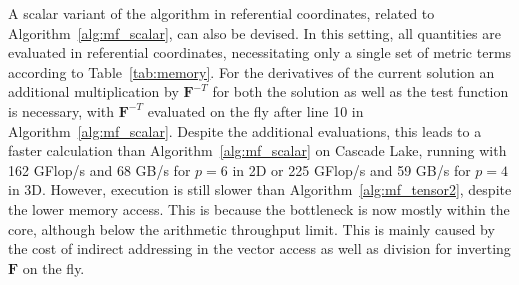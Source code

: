 \documentclass[AMA,STIX1COL]{WileyNJD-v2}
\newcommand*{\gz}[1]{\boldsymbol{#1}}
\begin{document}
A scalar variant of the algorithm in referential coordinates, related to Algorithm~\ref{alg:mf_scalar}, can also be devised.
In this setting, all quantities are evaluated in referential coordinates, necessitating only a single set of metric terms according to Table~\ref{tab:memory}.
For the derivatives of the current solution an additional multiplication by $\gz F^{-T}$ for both the solution as well as the test function is necessary,
with $\gz F^{-T}$ evaluated on the fly after line 10 in Algorithm~\ref{alg:mf_scalar}.
Despite the additional evaluations, this leads to a faster calculation than Algorithm~\ref{alg:mf_scalar} on Cascade Lake,
running with 162 GFlop/s and 68 GB/s for $p=6$ in 2D or 225 GFlop/s and 59 GB/s for $p=4$ in 3D.
However, execution is still slower than Algorithm~\ref{alg:mf_tensor2}, despite the lower memory access.
This is because the bottleneck is now mostly within the core, although below the arithmetic throughput limit.
This is mainly caused by the cost of indirect addressing in the vector access as well as division for inverting $\gz F$ on the fly.

\ifijnme
%
\else

\fi


%
\end{document}
